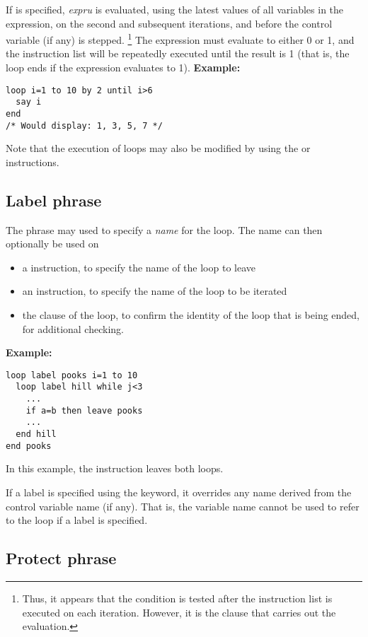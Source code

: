 \begin{description}
If  is specified, \emph{expru} is evaluated, using the
latest values of all variables in the expression, on the second and
subsequent iterations, and before the control variable (if any) is stepped.
\footnote{
Thus, it appears that the  condition is tested after the
instruction list is executed on each iteration.
However, it is the  clause that carries out the evaluation.
}
The expression must evaluate to either 0 or 1, and the instruction list
will be repeatedly executed until the result is 1 (that is, the loop
ends if the expression evaluates to 1).
 \textbf{Example:}
\begin{lstlisting}
loop i=1 to 10 by 2 until i>6
  say i
end
/* Would display: 1, 3, 5, 7 */
\end{lstlisting}
\end{description}
 Note that the execution of loops may also be modified by
using the  or  instructions.
\subsection{Label phrase}
 
The  phrase may used to specify a \emph{name} for the
loop.  The name can then optionally be used on
\begin{itemize}
\item a  instruction, to specify the name of the loop to leave
\item an  instruction, to specify the name of the loop to
be iterated
\item the  clause of the loop, to confirm the identity of the
loop that is being ended, for additional checking.
\end{itemize}
 \textbf{Example:}
\begin{lstlisting}
loop label pooks i=1 to 10
  loop label hill while j<3
    ...
    if a=b then leave pooks
    ...
  end hill
end pooks
\end{lstlisting}
In this example, the  instruction leaves both loops.
 
If a label is specified using the  keyword, it overrides
any name derived from the control variable name (if any).  That is, the
variable name cannot be used to refer to the loop if a label is
specified.
\subsection{Protect phrase}
 

